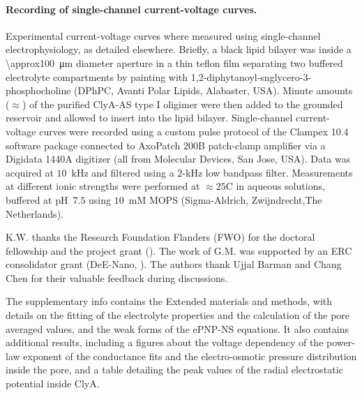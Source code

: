 \documentclass[journal=ancac3,manuscript=article,etalmode=truncate,maxauthors=0,layout=onecolumn]{achemso}
\begin{document}
\paragraph{Recording of single-channel current-voltage curves.}
%
Experimental current-voltage curves where measured using single-channel electrophysiology, as detailed
elsewhere.\cite{Maglia-2010,Soskine-2012,Soskine-2013} Briefly, a black lipid bilayer was inside a
\SI{\approx100}{\um} diameter aperture in a thin teflon film separating two buffered electrolyte compartments
by painting with 1,2-diphytanoyl-snglycero-3-phosphocholine (DPhPC, Avanti Polar Lipids, Alabaster, USA).
Minute amounts ($\approx$) of the purified ClyA-AS type I oligimer were then added to the grounded \cis{}
reservoir and allowed to insert into the lipid bilayer. Single-channel current-voltage curves were recorded
using a custom pulse protocol of the Clampex 10.4 software package connected to AxoPatch 200B patch-clamp
amplifier via a Digidata 1440A digitizer (all from Molecular Devices, San Jose, USA). Data was acquired at
$10$~kHz and filtered using a $2$-kHz low bandpass filter. Measurements at different ionic strengths were
performed at $\approx25$\textdegree C in aqueous  solutions, buffered at pH~$7.5$ using $10$~mM MOPS
(Sigma-Aldrich, Zwijndrecht,The Netherlands).

\begin{acknowledgement}
K.W. thanks the Research Foundation Flanders (FWO) for the doctoral fellowship and the project grant
(). The work of G.M. was supported by an ERC consolidator grant (DeE-Nano, ). The
authors thank Ujjal Barman and Chang Chen for their valuable feedback during discussions.
\end{acknowledgement}

\begin{suppinfo}
	The supplementary info contains the Extended materials and methods, with details on the fitting of the
	electrolyte properties and the calculation of the pore averaged values, and the weak forms of the ePNP-NS
	equations. It also contains additional results, including a figures about the voltage dependency of the
	power-law exponent of the conductance fits and the electro-osmotic pressure distribution inside the pore, and
	a table detailing the peak values of the radial electrostatic potential inside ClyA.
\end{suppinfo}



%
\end{document}

